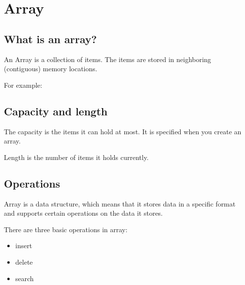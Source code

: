 
\chapter{Array}

\section{What is an array?}

An Array is a collection of items.
The items are stored in neighboring (contiguous) memory locations.


For example:

\section{Capacity and length}

The capacity is the items it can hold at most.
It is specified when you create an array.

Length is the number of items it holds currently.


\section{Operations}

Array is a data structure, which means that it stores data in a specific format and supports certain operations on the data it stores.


There are three basic operations in array:
\begin{itemize}
\item insert
\item delete
\item search
\end{itemize}